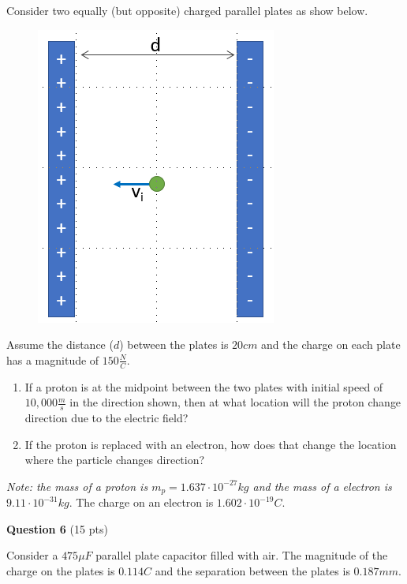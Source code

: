 \documentclass[14pt]{report}
\begin{document}
Consider two equally (but opposite) charged parallel plates as show below.

\begin{figure}[H]
\begin{center}
\includegraphics[scale=0.40]{exam1_6.png}
\end{center}
\end{figure}

Assume the distance ($d$) between the plates is $20cm$ and the charge on each plate has a magnitude of $150 \frac{N}{C}$. 



\begin{enumerate}[label=\Alph*]
\item If a proton is at the midpoint between the two plates with initial speed of $10,000 \frac{m}{s}$ in the direction shown, then at what location will the proton change direction due to the electric field?
\item If the proton is replaced with an electron, how does that change the location where the particle changes direction?
\end{enumerate}

\textit{Note: the mass of a proton is $m_p = 1.637 \cdot 10^{-27} kg$ and the mass of a electron is $9.11 \cdot 10^{-31} kg$}. The charge on an electron is $1.602 \cdot 10^{-19} C$.

\textbf{Question 6} (15 pts)

Consider a $475 \mu F$ parallel plate capacitor filled with air. The magnitude of the charge on the plates is $0.114C$ and the separation between the plates is $0.187mm$.
\end{document}
